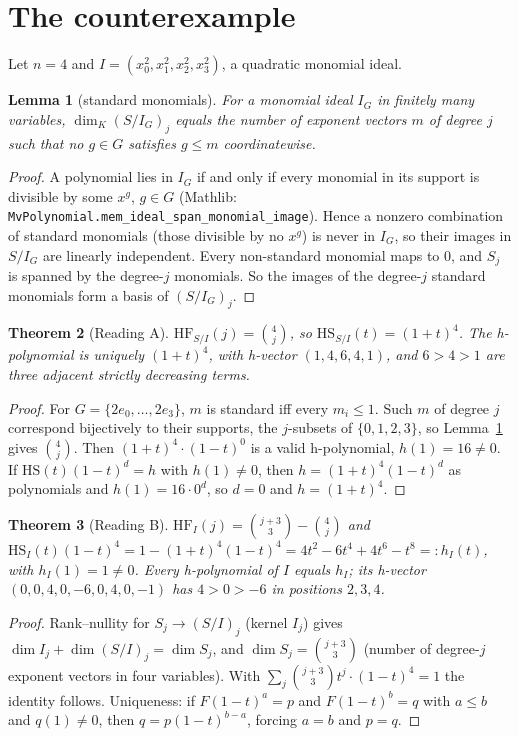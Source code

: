 \documentclass[11pt]{article}
\newtheorem{theorem}{Theorem}
\newtheorem{lemma}[theorem]{Lemma}
\theoremstyle{definition}
\begin{document}
\section{The counterexample}
Let $n=4$ and $I=(x_0^2,x_1^2,x_2^2,x_3^2)$, a quadratic monomial ideal.

\begin{lemma}[standard monomials]\label{lem:std}
For a monomial ideal $I_G$ in finitely many variables, $\dim_K (S/I_G)_j$ equals the number of
exponent vectors $m$ of degree $j$ such that no $g\in G$ satisfies $g\le m$ coordinatewise.
\end{lemma}
\begin{proof}
A polynomial lies in $I_G$ if and only if every monomial in its support is divisible by some
$x^g$, $g\in G$ (Mathlib: \texttt{MvPolynomial.mem\_ideal\_span\_monomial\_image}). Hence a
nonzero combination of standard monomials (those divisible by no $x^g$) is never in $I_G$, so
their images in $S/I_G$ are linearly independent. Every non-standard monomial maps to $0$, and
$S_j$ is spanned by the degree-$j$ monomials. So the images of the degree-$j$ standard monomials
form a basis of $(S/I_G)_j$.
\end{proof}

\begin{theorem}[Reading A]
$\mathrm{HF}_{S/I}(j)=\binom{4}{j}$, so $\mathrm{HS}_{S/I}(t)=(1+t)^4$. The h-polynomial is
uniquely $(1+t)^4$, with h-vector $(1,4,6,4,1)$, and $6>4>1$ are three adjacent strictly
decreasing terms.
\end{theorem}
\begin{proof}
For $G=\{2e_0,\dots,2e_3\}$, $m$ is standard iff every $m_i\le 1$. Such $m$ of degree $j$
correspond bijectively to their supports, the $j$-subsets of $\{0,1,2,3\}$, so
Lemma~\ref{lem:std} gives $\binom4j$. Then $(1+t)^4\cdot(1-t)^0$ is a valid h-polynomial,
$h(1)=16\ne0$. If $\mathrm{HS}(t)(1-t)^d=h$ with $h(1)\neq0$, then $h=(1+t)^4(1-t)^d$ as
polynomials and $h(1)=16\cdot 0^d$, so $d=0$ and $h=(1+t)^4$.
\end{proof}

\begin{theorem}[Reading B]
$\mathrm{HF}_I(j)=\binom{j+3}{3}-\binom4j$ and $\mathrm{HS}_I(t)(1-t)^4=1-(1+t)^4(1-t)^4
=4t^2-6t^4+4t^6-t^8=:h_I(t)$, with $h_I(1)=1\ne 0$. Every h-polynomial of $I$ equals $h_I$; its
h-vector $(0,0,4,0,-6,0,4,0,-1)$ has $4>0>-6$ in positions $2,3,4$.
\end{theorem}
\begin{proof}
Rank--nullity for $S_j\to(S/I)_j$ (kernel $I_j$) gives $\dim I_j+\dim(S/I)_j=\dim S_j$, and
$\dim S_j=\binom{j+3}{3}$ (number of degree-$j$ exponent vectors in four variables). With
$\sum_j\binom{j+3}{3}t^j\cdot(1-t)^4=1$ the identity follows. Uniqueness: if
$F(1-t)^a=p$ and $F(1-t)^b=q$ with $a\le b$ and $q(1)\neq0$, then $q=p(1-t)^{b-a}$, forcing
$a=b$ and $p=q$.
\end{proof}
\end{document}
